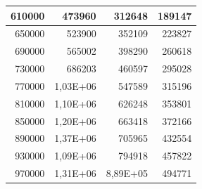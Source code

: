 \documentclass[a4paper, 12pt]{article}
\begin{document}
\begin{longtable}[c]{@{}rrrr@{}}
	\multicolumn{1}{|r|}{610000}                  & \multicolumn{1}{r|}{473960}                 & \multicolumn{1}{r|}{312648}                                                            & \multicolumn{1}{r|}{189147}                                                            \\* \midrule
	\multicolumn{1}{|r|}{650000}                  & \multicolumn{1}{r|}{523900}                 & \multicolumn{1}{r|}{352109}                                                            & \multicolumn{1}{r|}{223827}                                                            \\* \midrule
	\multicolumn{1}{|r|}{690000}                  & \multicolumn{1}{r|}{565002}                 & \multicolumn{1}{r|}{398290}                                                            & \multicolumn{1}{r|}{260618}                                                            \\* \midrule
	\multicolumn{1}{|r|}{730000}                  & \multicolumn{1}{r|}{686203}                 & \multicolumn{1}{r|}{460597}                                                            & \multicolumn{1}{r|}{295028}                                                            \\* \midrule
	\multicolumn{1}{|r|}{770000}                  & \multicolumn{1}{r|}{1,03E+06}               & \multicolumn{1}{r|}{547589}                                                            & \multicolumn{1}{r|}{315196}                                                            \\* \midrule
	\multicolumn{1}{|r|}{810000}                  & \multicolumn{1}{r|}{1,10E+06}               & \multicolumn{1}{r|}{626248}                                                            & \multicolumn{1}{r|}{353801}                                                            \\* \midrule
	\multicolumn{1}{|r|}{850000}                  & \multicolumn{1}{r|}{1,20E+06}               & \multicolumn{1}{r|}{663418}                                                            & \multicolumn{1}{r|}{372166}                                                            \\* \midrule
	\multicolumn{1}{|r|}{890000}                  & \multicolumn{1}{r|}{1,37E+06}               & \multicolumn{1}{r|}{705965}                                                            & \multicolumn{1}{r|}{432554}                                                            \\* \midrule
	\multicolumn{1}{|r|}{930000}                  & \multicolumn{1}{r|}{1,09E+06}               & \multicolumn{1}{r|}{794918}                                                            & \multicolumn{1}{r|}{457822}                                                            \\* \midrule
	\multicolumn{1}{|r|}{970000}                  & \multicolumn{1}{r|}{1,31E+06}               & \multicolumn{1}{r|}{8,89E+05}                                                          & \multicolumn{1}{r|}{494771}                                                            \\* \bottomrule
\end{longtable}
		
\end{document}
